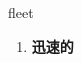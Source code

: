 
\begin{frame}
{\huge fleet}
\begin{center}
\begin{enumerate}\Large
  \item \textbf{迅速的}
\end{enumerate}
\end{center}
\end{frame}
